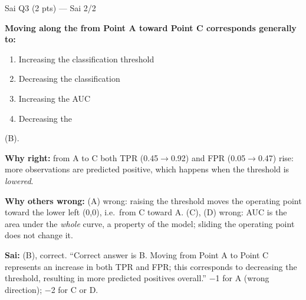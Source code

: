 \begin{qbox}{Sai Q3 (2 pts) --- Sai 2/2}
 \par
\textbf{Moving along the  from Point A toward Point C corresponds generally to:}
\begin{enumerate}[label=(\Alph*),leftmargin=1.6em,itemsep=0pt]
\item Increasing the classification threshold
\item Decreasing the classification 
\item Increasing the AUC
\item Decreasing the 
\end{enumerate}
\ans (B).
\par\textbf{Why right:} from A to C both TPR (0.45$\to$0.92) and FPR (0.05$\to$0.47) rise: more observations are predicted positive, which happens when the threshold is \emph{lowered}. 
\par\textbf{Why others wrong:}
(A) wrong: raising the threshold moves the operating point toward the lower left (0,0), i.e.\ from C toward A.
(C), (D) wrong: AUC is the area under the \emph{whole} curve, a property of the model; sliding the operating point does not change it.
\par\textbf{\color{dblue}Sai:} (B), correct. \grader ``Correct answer is B. Moving from Point A to Point C represents an increase in both TPR and FPR; this corresponds to decreasing the threshold, resulting in more predicted positives overall.'' $-$1 for A (wrong direction); $-$2 for C or D.
\end{qbox}

